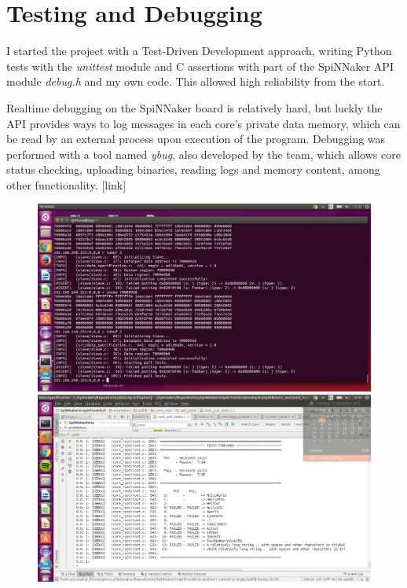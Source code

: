 \section{Testing and Debugging}
I started the project with a Test-Driven Development approach, writing Python tests with the \textit{unittest} module and C assertions with part of the SpiNNaker API module \textit{debug.h} and my own code. This allowed high reliability from the start.

Realtime debugging on the SpiNNaker board is relatively hard, but luckly the API provides ways to log messages in each core's private data memory, which can be read by an external process upon execution of the program. Debugging was performed with a tool named \textit{ybug}, also developed by the team, which allows core status checking, uploading binaries, reading logs and memory content, among other functionality.\cite{ybug} [link]

\begin{figure}
  \centering
  \includegraphics[width=1.3\linewidth, natwidth=1366, natheight=768]{images/debugging.png}
  \label{fig:debugging}
  \centering
  \includegraphics[width=1.3\linewidth, natwidth=1366, natheight=768]{images/testing.png}
  \label{fig:testing}
\end{figure}


